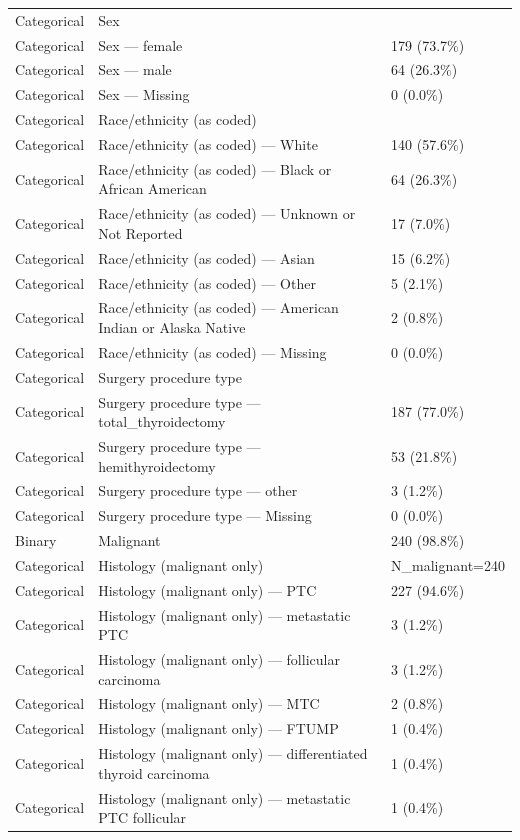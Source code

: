 \begin{table}[htbp]
\begin{tabular}{lll}
Categorical & Sex &  \\
Categorical & Sex — female & 179 (73.7\%) \\
Categorical & Sex — male & 64 (26.3\%) \\
Categorical & Sex — Missing & 0 (0.0\%) \\
Categorical & Race/ethnicity (as coded) &  \\
Categorical & Race/ethnicity (as coded) — White & 140 (57.6\%) \\
Categorical & Race/ethnicity (as coded) — Black or African American & 64 (26.3\%) \\
Categorical & Race/ethnicity (as coded) — Unknown or Not Reported & 17 (7.0\%) \\
Categorical & Race/ethnicity (as coded) — Asian & 15 (6.2\%) \\
Categorical & Race/ethnicity (as coded) — Other & 5 (2.1\%) \\
Categorical & Race/ethnicity (as coded) — American Indian or Alaska Native & 2 (0.8\%) \\
Categorical & Race/ethnicity (as coded) — Missing & 0 (0.0\%) \\
Categorical & Surgery procedure type &  \\
Categorical & Surgery procedure type — total\_thyroidectomy & 187 (77.0\%) \\
Categorical & Surgery procedure type — hemithyroidectomy & 53 (21.8\%) \\
Categorical & Surgery procedure type — other & 3 (1.2\%) \\
Categorical & Surgery procedure type — Missing & 0 (0.0\%) \\
Binary & Malignant & 240 (98.8\%) \\
Categorical & Histology (malignant only) & N\_malignant=240 \\
Categorical & Histology (malignant only) — PTC & 227 (94.6\%) \\
Categorical & Histology (malignant only) — metastatic PTC & 3 (1.2\%) \\
Categorical & Histology (malignant only) — follicular carcinoma & 3 (1.2\%) \\
Categorical & Histology (malignant only) — MTC & 2 (0.8\%) \\
Categorical & Histology (malignant only) — FTUMP & 1 (0.4\%) \\
Categorical & Histology (malignant only) — differentiated thyroid carcinoma & 1 (0.4\%) \\
Categorical & Histology (malignant only) — metastatic PTC follicular & 1 (0.4\%) \\

\end{tabular}
\end{table}
